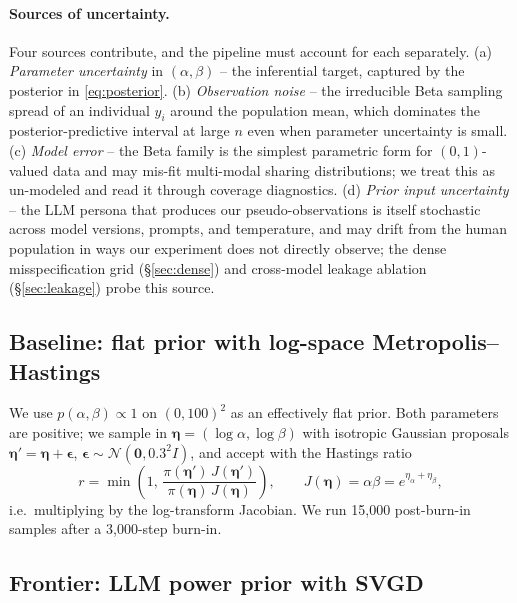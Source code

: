 \documentclass[11pt]{article}
\begin{document}
\paragraph{Sources of uncertainty.}
Four sources contribute, and the pipeline must account for each separately.
(a) \emph{Parameter uncertainty} in $(\alpha, \beta)$ -- the inferential target, captured by the
posterior in \eqref{eq:posterior}.
(b) \emph{Observation noise} -- the irreducible Beta sampling spread of an individual
$y_i$ around the population mean, which dominates the posterior-predictive interval at
large $n$ even when parameter uncertainty is small.
(c) \emph{Model error} -- the Beta family is the simplest parametric form for $(0,1)$-valued
data and may mis-fit multi-modal sharing distributions; we treat this as un-modeled and
read it through coverage diagnostics.
(d) \emph{Prior input uncertainty} -- the LLM persona that produces our pseudo-observations
is itself stochastic across model versions, prompts, and temperature, and may drift from the
human population in ways our experiment does not directly observe; the dense
misspecification grid (\S\ref{sec:dense}) and cross-model leakage ablation
(\S\ref{sec:leakage}) probe this source.

\subsection{Baseline: flat prior with log-space Metropolis--Hastings}

We use $p(\alpha,\beta) \propto 1$ on $(0, 100)^2$ as an effectively flat prior. Both
parameters are positive; we sample in $\bm{\eta} = (\log\alpha, \log\beta)$ with isotropic
Gaussian proposals $\bm{\eta}' = \bm{\eta} + \bm{\epsilon}$, $\bm{\epsilon} \sim \mathcal{N}(\bm{0}, 0.3^2 I)$,
and accept with the Hastings ratio
\begin{equation}
  r = \min\!\left(1, \,
  \frac{\pi(\bm{\eta}') \, J(\bm{\eta}')}
       {\pi(\bm{\eta}) \, J(\bm{\eta})}\right),
  \qquad J(\bm{\eta}) = \alpha \beta = e^{\eta_\alpha + \eta_\beta},
  \label{eq:mh}
\end{equation}
i.e.\ multiplying by the log-transform Jacobian. We run 15{,}000 post-burn-in samples
after a 3{,}000-step burn-in.

\subsection{Frontier: LLM power prior with SVGD}
\end{document}
